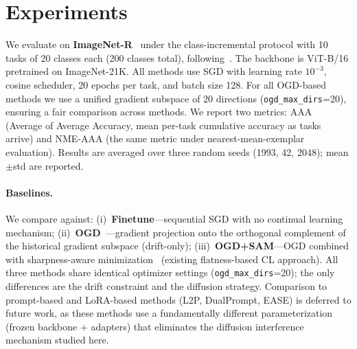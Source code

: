 \documentclass{article}
\begin{document}










\section{Experiments}
\label{sec:experiments}

We evaluate on \textbf{ImageNet-R}~\cite{hendrycks2021many} under the class-incremental protocol with 10 tasks of 20 classes each (200 classes total), following~\cite{bian2024continual}.
The backbone is ViT-B/16 pretrained on ImageNet-21K.
All methods use SGD with learning rate $10^{-3}$, cosine scheduler, 20 epochs per task, and batch size 128.
For all OGD-based methods we use a unified gradient subspace of 20 directions (\texttt{ogd\_max\_dirs}=20), ensuring a fair comparison across methods.
We report two metrics: AAA (Average of Average Accuracy, mean per-task cumulative accuracy as tasks arrive) and NME-AAA (the same metric under nearest-mean-exemplar evaluation).
Results are averaged over three random seeds (1993, 42, 2048); mean$\pm$std are reported.

\paragraph{Baselines.}
We compare against: (i)~\textbf{Finetune}---sequential SGD with no continual learning mechanism; (ii)~\textbf{OGD}~\cite{farajtabarOrthogonalGradientDescent2020}---gradient projection onto the orthogonal complement of the historical gradient subspace (drift-only); (iii)~\textbf{OGD+SAM}---OGD combined with sharpness-aware minimization~\cite{foret2021sharpnessaware} (existing flatness-based CL approach).
All three methods share identical optimizer settings (\texttt{ogd\_max\_dirs}=20); the only differences are the drift constraint and the diffusion strategy.
Comparison to prompt-based and LoRA-based methods (L2P, DualPrompt, EASE) is deferred to future work, as these methods use a fundamentally different parameterization (frozen backbone + adapters) that eliminates the diffusion interference mechanism studied here.
\end{document}
